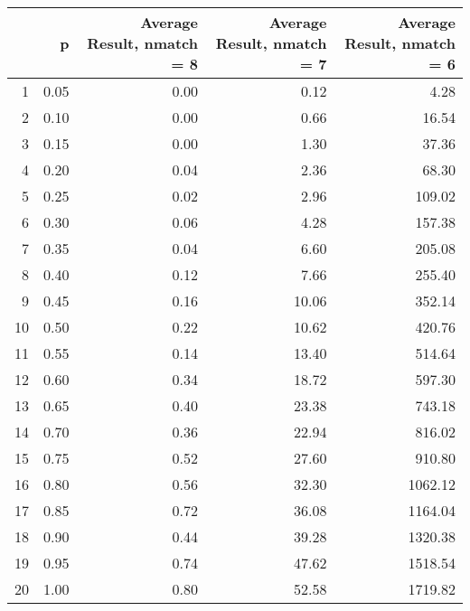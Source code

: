 \begin{table}[ht]
\centering
\begin{tabular}{rrrrr}
  \hline
 & p & Average Result, nmatch = 8 & Average Result, nmatch = 7 & Average Result, nmatch = 6 \\ 
  \hline
1 & 0.05 & 0.00 & 0.12 & 4.28 \\ 
  2 & 0.10 & 0.00 & 0.66 & 16.54 \\ 
  3 & 0.15 & 0.00 & 1.30 & 37.36 \\ 
  4 & 0.20 & 0.04 & 2.36 & 68.30 \\ 
  5 & 0.25 & 0.02 & 2.96 & 109.02 \\ 
  6 & 0.30 & 0.06 & 4.28 & 157.38 \\ 
  7 & 0.35 & 0.04 & 6.60 & 205.08 \\ 
  8 & 0.40 & 0.12 & 7.66 & 255.40 \\ 
  9 & 0.45 & 0.16 & 10.06 & 352.14 \\ 
  10 & 0.50 & 0.22 & 10.62 & 420.76 \\ 
  11 & 0.55 & 0.14 & 13.40 & 514.64 \\ 
  12 & 0.60 & 0.34 & 18.72 & 597.30 \\ 
  13 & 0.65 & 0.40 & 23.38 & 743.18 \\ 
  14 & 0.70 & 0.36 & 22.94 & 816.02 \\ 
  15 & 0.75 & 0.52 & 27.60 & 910.80 \\ 
  16 & 0.80 & 0.56 & 32.30 & 1062.12 \\ 
  17 & 0.85 & 0.72 & 36.08 & 1164.04 \\ 
  18 & 0.90 & 0.44 & 39.28 & 1320.38 \\ 
  19 & 0.95 & 0.74 & 47.62 & 1518.54 \\ 
  20 & 1.00 & 0.80 & 52.58 & 1719.82 \\ 
   \hline
\end{tabular}
\end{table}
